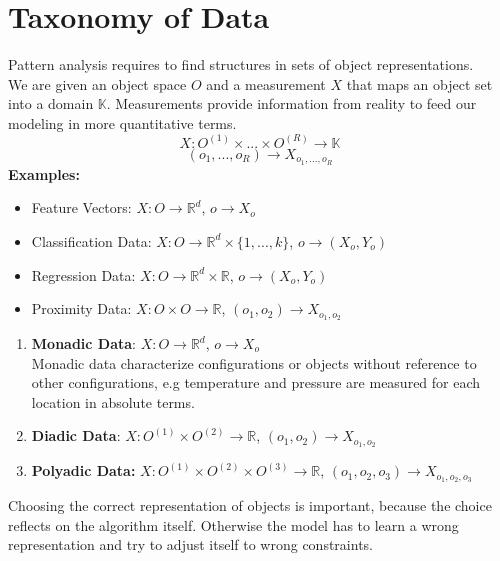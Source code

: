 \documentclass[twoside]{article}
\begin{document}
\newpage

\section{Taxonomy of Data}

Pattern analysis requires to find structures in sets of object representations.\\
We are given an object space $O$ and a measurement $X$ that maps an object set into a domain $\mathbb{K}$. Measurements provide information from reality to feed our modeling in more quantitative terms.
\begin{equation*}
    X : O^{(1)} \times ... \times O^{(R)} \rightarrow \mathbb{K}
\end{equation*}
\begin{equation*}
    (o_1,...,o_R) \rightarrow X_{o_1,...,o_R}
\end{equation*}
\textbf{Examples:}
\begin{itemize}
    \item Feature Vectors: $X : O \rightarrow \mathbb{R}^d$, $o \rightarrow X _o$
    \item Classification Data: $X : O \rightarrow \mathbb{R}^d \times \{1,...,k\} $, $o \rightarrow (X _o, Y_o)$
    \item Regression Data: $X : O \rightarrow \mathbb{R}^d \times \mathbb{R}$, $o \rightarrow (X _o, Y_o)$
    \item Proximity Data: $X: O \times O \rightarrow \mathbb{R}$, $(o_1,o_2) \rightarrow X_{o_1,o_2}$
\end{itemize}
\renewcommand{\theenumi}{\alph{enumi}}
\begin{enumerate}
    \item \textbf{Monadic Data}: $X : O \rightarrow \mathbb{R}^d$, $o \rightarrow X _o$
    \\Monadic data characterize configurations or objects without reference to other configurations, e.g temperature and pressure are measured for each location in absolute terms.
    \item \textbf{Diadic Data}: $X: O^{(1)} \times O^{(2)} \rightarrow \mathbb{R}$, $(o_1,o_2) \rightarrow X_{o_1,o_2}$
    \item \textbf{Polyadic Data:} $X: O^{(1)} \times O^{(2)} \times O^{(3)} \rightarrow \mathbb{R}$, $(o_1,o_2,o_3) \rightarrow X_{o_1,o_2,o_3}$
\end{enumerate}
Choosing the correct representation of objects is important, because the choice reflects on the algorithm itself. Otherwise the model has to learn a wrong representation and try to adjust itself to wrong constraints.
\end{document}
